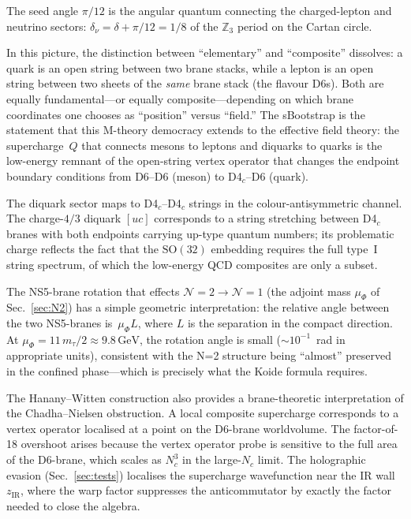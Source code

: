 \documentclass[aps,prd,twocolumn,showpacs,preprintnumbers,superscriptaddress]{revtex4-2}
\newcommand{\SO}{\mathrm{SO}}
\newcommand{\GeV}{\,\mathrm{GeV}}
\begin{document}
The seed angle $\pi/12$ is the angular quantum connecting
the charged-lepton and neutrino sectors:
$\delta_\nu = \delta + \pi/12 = 1/8$ of the
$\mathbb{Z}_3$ period on the Cartan circle.

In this picture, the distinction between ``elementary'' and
``composite'' dissolves: a quark is an open string between
two brane stacks, while a lepton is an open string between
two sheets of the \emph{same} brane stack (the flavour D6s).
Both are equally fundamental---or equally composite---depending
on which brane coordinates one chooses as ``position'' versus
``field.''
The sBootstrap is the statement that this M-theory democracy
extends to the effective field theory: the supercharge~$Q$
that connects mesons to leptons and diquarks to quarks is the
low-energy remnant of the open-string vertex operator that
changes the endpoint boundary conditions from
D6--D6 (meson) to D4$_c$--D6 (quark).

The diquark sector maps to D4$_c$--D4$_c$ strings in the
colour-antisymmetric channel.  The charge-$4/3$ diquark
$[uc]$ corresponds to a string stretching between D4$_c$
branes with both endpoints carrying up-type quantum numbers;
its problematic charge reflects the fact that the $\SO(32)$
embedding requires the full type~I string spectrum, of which
the low-energy QCD composites are only a subset.

The NS5-brane rotation that effects
$\mathcal{N}{=}2 \to \mathcal{N}{=}1$ (the adjoint mass
$\mu_\Phi$ of Sec.~\ref{sec:N2}) has a simple geometric
interpretation: the relative angle between the two NS5-branes
is~$\mu_\Phi L$, where $L$ is the separation in the
compact direction.
At $\mu_\Phi = 11\,m_\tau/2 \approx 9.8\GeV$, the rotation
angle is small ($\sim 10^{-1}$~rad in appropriate units),
consistent with the N=2 structure being ``almost'' preserved
in the confined phase---which is precisely what the Koide
formula requires.

The Hanany--Witten construction also provides a
brane-theoretic interpretation of the Chadha--Nielsen
obstruction.
A local composite supercharge corresponds to a vertex
operator localised at a point on the D6-brane worldvolume.
The factor-of-18 overshoot arises because the vertex
operator probe is sensitive to the full area of the
D6-brane, which scales as $N_c^3$ in the large-$N_c$ limit.
The holographic evasion (Sec.~\ref{sec:tests}) localises the
supercharge wavefunction near the IR wall $z_{\mathrm{IR}}$,
where the warp factor suppresses the anticommutator by
exactly the factor needed to close the algebra.
\end{document}
